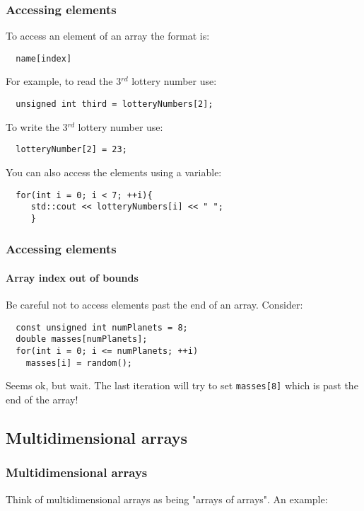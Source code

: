 \documentclass{beamer}
\begin{document}
\begin{frame}[fragile]
  \frametitle{Accessing elements}
  
  To access an element of an array the format is:
  \begin{lstlisting}
  name[index]
  \end{lstlisting}
  \pause
  For example, to read the 3$^{rd}$ lottery number use:
  \begin{lstlisting}
  unsigned int third = lotteryNumbers[2];
  \end{lstlisting}
  \pause
  To write the 3$^{rd}$ lottery number use:
  \begin{lstlisting}
  lotteryNumber[2] = 23;
  \end{lstlisting}
  \pause
  You can also access the elements using a variable:
  \begin{lstlisting}
  for(int i = 0; i < 7; ++i){
     std::cout << lotteryNumbers[i] << " ";
     }
  \end{lstlisting}
\end{frame}

\begin{frame}[fragile]
  \frametitle{Accessing elements}
  \framesubtitle{Array index out of bounds}
    \begin{warnblocke}Be careful not to access elements past the end of an array.  Consider:
    \begin{lstlisting}
  const unsigned int numPlanets = 8;
  double masses[numPlanets];
  for(int i = 0; i <= numPlanets; ++i)
    masses[i] = random();
    \end{lstlisting}
	Seems ok, but wait.  The last iteration will try to set \texttt{masses[8]} which is past the end of the array!
    \end{warnblocke}

\end{frame}

\subsection{Multidimensional arrays}

\begin{frame}[fragile]
  \frametitle{Multidimensional arrays}
  Think of multidimensional arrays as being "arrays of arrays".  An example:
    
  

\end{frame}
\end{document}
